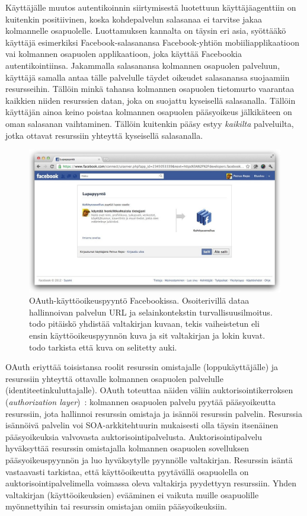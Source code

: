 \documentclass[finnish,gradu]{tktltiki}
\begin{document}
  Käyttäjälle muutos autentikoinnin siirtymisestä luotettuun käyttäjäagenttiin on kuitenkin positiivinen, koska kohdepalvelun salasanaa ei tarvitse jakaa kolmannelle osapuolelle. Luottamuksen kannalta on täysin eri asia, syöttääkö käyttäjä esimerkiksi Facebook-salasanansa Facebook-yhtiön mobiiliapplikaatioon vai kolmannen osapuolen applikaatioon, joka käyttää Facebookia autentikointiinsa. Jakammalla salasanansa kolmannen osapuolen palveluun, käyttäjä samalla antaa tälle palvelulle täydet oikeudet salasanansa suojaamiin resursseihin. Tällöin minkä tahansa kolmannen osapuolen tietomurto vaarantaa kaikkien niiden resurssien datan, joka on suojattu kyseisellä salasanalla. Tällöin käyttäjän ainoa keino poistaa kolmannen osapuolen pääsyoikeus jälkikäteen on oman salasanan vaihtaminen. Tällöin kuitenkin pääsy estyy \emph{kaikilta} palveluilta, jotka ottavat resurssiin yhteyttä kyseisellä salasanalla.

  \begin{figure}
    \centering
    \includegraphics[width=1.0\textwidth]{images/facebook_oauth_lupapyynto.jpg}
    \caption{OAuth-käyttöoikeuspyyntö Facebookissa. Osoiterivillä dataa hallinnoivan palvelun URL ja selainkontekstin turvallisuusilmoitus. todo pitäiskö yhdistää valtakirjan kuvaan, tekis vaiheistetun eli ensin käyttöoikeuspyynnön kuva ja sit valtakirjan ja lokin kuvat. todo tarkista että kuva on selitetty auki.}
    \label{fig:facebook_oauth_lupapyynto}
  \end{figure}

  OAuth eriyttää toisistansa roolit resurssin omistajalle (loppukäyttäjälle) ja resurssiin yhteyttä ottavalle kolmannen osapuolen palvelulle (identiteetinkuluttajalle). OAuth toteuttaa näiden väliin auktorisointikerroksen (\emph{authorization layer})~\cite{ietf_oauth2}: kolmannen osapuolen palvelu pyytää pääsyoikeutta resurssiin, jota hallinnoi resurssin omistaja ja isännöi resurssin palvelin. Resurssia isännöivä palvelin voi SOA-arkkitehtuurin mukaisesti olla täysin itsenäinen pääsyoikeuksia valvovasta auktorisointipalvelusta. Auktorisointipalvelu hyväksyttää resurssin omistajalla kolmannen osapuolen sovelluksen pääsyoikeuspyynnön ja luo hyväksytylle pyynnölle valtakirjan. Resurssin isäntä vastaavasti tarkistaa, että käyttöoikeutta pyytävällä osapuolella on auktorisointipalvelimella voimassa oleva valtakirja pyydettyyn resurssiin. Yhden valtakirjan (käyttöoikeuksien) evääminen ei vaikuta muille osapuolille myönnettyihin tai resurssin omistajan omiin pääsyoikeuksiin.
\end{document}
